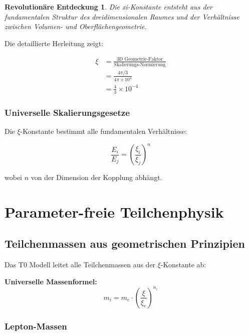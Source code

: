 \documentclass[12pt,a4paper]{report}
\newtheorem{entdeckung}{Revolutionäre Entdeckung}[chapter]
\begin{document}
	\begin{entdeckung}
		Die xi-Konstante entsteht aus der fundamentalen Struktur des dreidimensionalen Raumes und der Verhältnisse zwischen Volumen- und Oberflächengeometrie.
	\end{entdeckung}
	
	Die detaillierte Herleitung zeigt:
	
	\begin{align}
		\xi &= \frac{\text{3D Geometrie-Faktor}}{\text{Skalierungs-Normierung}} \\
		&= \frac{4\pi/3}{4\pi \times 10^4} \\
		&= \frac{4}{3} \times 10^{-4}
	\end{align}
	
	\subsection{Universelle Skalierungsgesetze}
	
	Die $\xi$-Konstante bestimmt alle fundamentalen Verhältnisse:
	
	\begin{equation}
		\frac{E_i}{E_j} = \left(\frac{\xi_i}{\xi_j}\right)^n
	\end{equation}
	
	wobei $n$ von der Dimension der Kopplung abhängt.
	
	\chapter{Parameter-freie Teilchenphysik}
	
	\section{Teilchenmassen aus geometrischen Prinzipien}
	
	Das T0 Modell leitet alle Teilchenmassen aus der $\xi$-Konstante ab:
	
	\begin{formel}
		\textbf{Universelle Massenformel:}
		\begin{equation}
			m_i = m_e \cdot \left(\frac{\xi}{\xi_e}\right)^{n_i}
		\end{equation}
	\end{formel}
	
	\subsection{Lepton-Massen}
	
\end{document}
